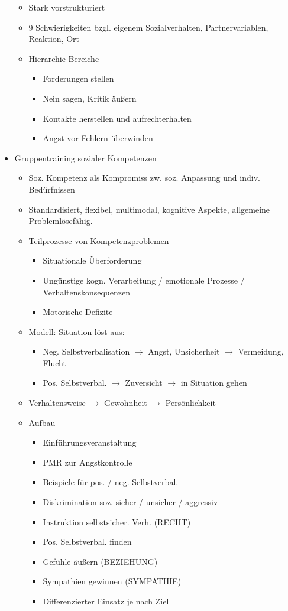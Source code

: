 \documentclass[11pt, paper=a4, twocolumn]{scrartcl}
\begin{document}
\begin{itemize}
				\begin{itemize}
					\item Stark vorstrukturiert
					\item 9 Schwierigkeiten bzgl. eigenem Sozialverhalten, Partnervariablen, Reaktion, Ort
					\item Hierarchie Bereiche
						\begin{itemize}
							\item Forderungen stellen
							\item Nein sagen, Kritik äußern
							\item Kontakte herstellen und aufrechterhalten
							\item Angst vor Fehlern überwinden
						\end{itemize}
				\end{itemize}
			\item Gruppentraining sozialer Kompetenzen
				\begin{itemize}
					\item Soz. Kompetenz als Kompromiss zw. soz. Anpassung und indiv. Bedürfnissen
					\item Standardisiert, flexibel, multimodal, kognitive Aspekte, allgemeine Problemlösefähig.
					\item Teilprozesse von Kompetenzproblemen
						\begin{itemize}
							\item Situationale Überforderung
							\item Ungünstige kogn. Verarbeitung / emotionale Prozesse / Verhaltenskonsequenzen
							\item Motorische Defizite
						\end{itemize}
					\item Modell: Situation löst aus:
						\begin{itemize}
							\item Neg. Selbstverbalisation $\rightarrow$ Angst, Unsicherheit $\rightarrow$ Vermeidung, 
								Flucht
							\item Pos. Selbstverbal. $\rightarrow$ Zuversicht $\rightarrow$ in Situation gehen
						\end{itemize}
					\item Verhaltensweise $\rightarrow$ Gewohnheit $\rightarrow$ Persönlichkeit
					\item Aufbau
						\begin{itemize}
							\item Einführungsveranstaltung
							\item PMR zur Angstkontrolle
							\item Beispiele für pos. / neg. Selbstverbal.
							\item Diskrimination soz. sicher / unsicher / aggressiv
							\item Instruktion selbstsicher. Verh. (RECHT)
							\item Pos. Selbstverbal. finden
							\item Gefühle äußern (BEZIEHUNG)
							\item Sympathien gewinnen (SYMPATHIE)
							\item Differenzierter Einsatz je nach Ziel


\end{itemize}
\end{itemize}
\end{itemize}
\end{document}
